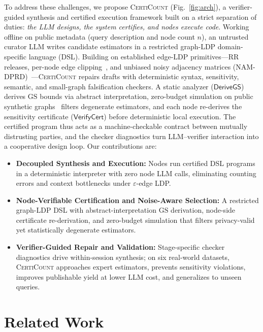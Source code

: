 \documentclass[conference]{IEEEtran}
\theoremstyle{ieeeitalic}
\newcommand{\GS}{\mathrm{GS}}
\newcommand{\DeriveGS}{\mathsf{DeriveGS}}
\newcommand{\VerifyCert}{\mathsf{VerifyCert}}
\begin{document}
To address these challenges, we propose \textsc{CertiCount} (Fig.~\ref{fig:arch}), a verifier-guided synthesis and certified execution framework built on a strict separation of duties: \emph{the LLM designs, the system certifies, and nodes execute code}. Working offline on public metadata (query description and node count $n$), an untrusted curator LLM writes candidate estimators in a restricted graph-LDP domain-specific language (DSL). Building on established edge-LDP primitives---RR releases, per-node edge clipping~\cite{imola2022communication}, and unbiased noisy adjacency matrices (NAM-DPRD)~\cite{guo2025nam}---\textsc{CertiCount} repairs drafts with deterministic syntax, sensitivity, semantic, and small-graph falsification checkers. A static analyzer ($\DeriveGS$) derives $\GS$ bounds via abstract interpretation, zero-budget simulation on public synthetic graphs~\cite{holme2002growing,chung2002connected} filters degenerate estimators, and each node re-derives the sensitivity certificate ($\VerifyCert$) before deterministic local execution. The certified program thus acts as a machine-checkable contract between mutually distrusting parties, and the checker diagnostics turn LLM--verifier interaction into a cooperative design loop. Our contributions are:
\begin{itemize}
    \item \textbf{Decoupled Synthesis and Execution:} Nodes run certified DSL programs in a deterministic interpreter with zero node LLM calls, eliminating counting errors and context bottlenecks under $\varepsilon$-edge LDP.
    \item \textbf{Node-Verifiable Certification and Noise-Aware Selection:} A restricted graph-LDP DSL with abstract-interpretation $\GS$ derivation, node-side certificate re-derivation, and zero-budget simulation that filters privacy-valid yet statistically degenerate estimators.
    \item \textbf{Verifier-Guided Repair and Validation:} Stage-specific checker diagnostics drive within-session synthesis; on six real-world datasets, \textsc{CertiCount} approaches expert estimators, prevents sensitivity violations, improves publishable yield at lower LLM cost, and generalizes to unseen queries.
\end{itemize}

\section{Related Work}
\label{sec:related}
\end{document}
